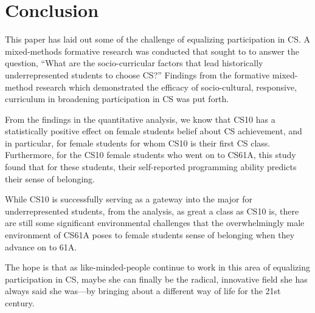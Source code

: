 \documentclass[oneside,titlepage,numbers=noenddot,headinclude,%
               footinclude=true,cleardoublepage=empty,abstractoff,BCOR=2mm,%
               paper=a4,fontsize=11pt,ngerman,american]{scrreprt}
\numberwithin{theorem}{chapter}
\numberwithin{definition}{chapter}
\numberwithin{algorithm}{chapter}
\numberwithin{figure}{chapter}
\numberwithin{table}{chapter}
\numberwithin{equation}{chapter}
\begin{document}
 


\section*{Conclusion}

This paper has laid out some of the challenge of equalizing participation in CS. A mixed-methods formative research was conducted that sought to to answer the question, ``What are the socio-curricular factors that lead historically underrepresented students to choose CS?'' Findings from the formative mixed-method research which demonstrated the efficacy of socio-cultural, responsive, curriculum in broadening participation in CS was put forth. 


From the findings in the quantitative analysis, we know that CS10 has a statistically positive effect on female students belief about CS achievement, and in particular, for female students for whom CS10 is their first CS class. Furthermore, for the CS10 female students who went on to CS61A, this study found that for these students, their self-reported programming ability predicts their sense of belonging. 

While CS10 is successfully serving as a gateway into the major for underrepresented students, from the analysis, as great a class as CS10 is, there are still some significant environmental challenges that the overwhelmingly male environment of CS61A poses to female students sense of belonging when they advance on to 61A.

The hope is that as like-minded-people continue to work in this area of equalizing participation in CS, maybe she can finally be the radical, innovative field she has always said she was---by bringing about a different way of life for the 21st century. 




\end{document}
